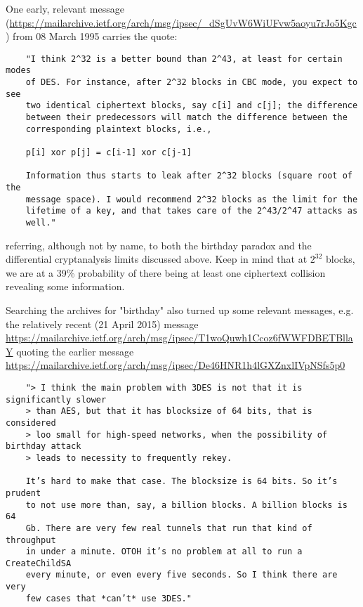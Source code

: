 \documentclass[%
 aip,
 jmp,%
 amsmath,amssymb,
 reprint,%
]{revtex4-1}
\begin{document}
One early, relevant message
(\url{https://mailarchive.ietf.org/arch/msg/ipsec/_dSgUvW6WiUFvw5aoyu7rJo5Kgc})
from 08 March 1995 carries the quote:

\begin{widetext}
\begin{verbatim}
	"I think 2^32 is a better bound than 2^43, at least for certain modes
	of DES. For instance, after 2^32 blocks in CBC mode, you expect to see
	two identical ciphertext blocks, say c[i] and c[j]; the difference
	between their predecessors will match the difference between the
	corresponding plaintext blocks, i.e.,

	p[i] xor p[j] = c[i-1] xor c[j-1]

	Information thus starts to leak after 2^32 blocks (square root of the
	message space). I would recommend 2^32 blocks as the limit for the
	lifetime of a key, and that takes care of the 2^43/2^47 attacks as
	well."
\end{verbatim}
\end{widetext}
referring, although not by name, to both the birthday paradox and the
differential cryptanalysis limits discussed above.  Keep in mind that
at $2^{32}$ blocks, we are at a 39\% probability of there being at least
one ciphertext collision revealing some information.

Searching the archives for "birthday" also turned up some relevant
messages, e.g. the relatively recent (21 April 2015) message
\url{https://mailarchive.ietf.org/arch/msg/ipsec/T1woQuwh1Ccoz6fWWFDBETBllaY}
quoting the earlier message
\url{https://mailarchive.ietf.org/arch/msg/ipsec/De46HNR1h4lGXZnxlIVpNSfs5p0}

\begin{widetext}
\begin{verbatim}
	"> I think the main problem with 3DES is not that it is significantly slower
	> than AES, but that it has blocksize of 64 bits, that is considered
	> loo small for high-speed networks, when the possibility of birthday attack
	> leads to necessity to frequently rekey.

	It’s hard to make that case. The blocksize is 64 bits. So it’s prudent
	to not use more than, say, a billion blocks. A billion blocks is 64
	Gb. There are very few real tunnels that run that kind of throughput
	in under a minute. OTOH it’s no problem at all to run a CreateChildSA
	every minute, or even every five seconds. So I think there are very
	few cases that *can’t* use 3DES."
\end{verbatim}
\end{widetext}
\end{document}
